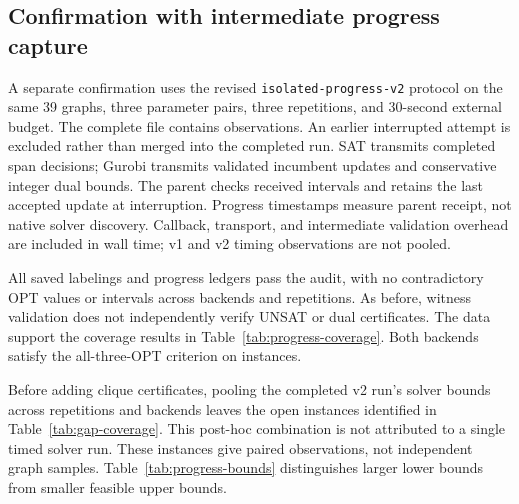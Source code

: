 \subsection{Confirmation with intermediate progress capture}
\label{sec:progress-confirmation}
A separate confirmation uses the revised \texttt{isolated-progress-v2}
protocol on the same 39 graphs, three parameter pairs, three repetitions,
and 30-second external budget. The complete file
 contains
\ProgressObservations{} observations. An earlier interrupted attempt is
excluded rather than merged into the completed run.
SAT transmits completed span decisions; Gurobi transmits validated
incumbent updates and conservative integer dual bounds. The parent checks
received intervals and retains the last accepted update at interruption.
Progress timestamps measure parent receipt, not native solver discovery.
Callback, transport, and intermediate validation overhead are included in
wall time; v1 and v2 timing observations are not pooled.

All saved labelings and progress ledgers pass the audit, with no
contradictory OPT values or intervals across backends and repetitions.
As before, witness validation does not independently verify UNSAT or dual
certificates. The data support the coverage results in
Table~\ref{tab:progress-coverage}. Both backends satisfy the all-three-OPT
criterion on \ProgressJointStable{} instances.

\begin{table}[htbp]
\centering\small
\caption{Optimality coverage and feasible solutions in v2.}
\label{tab:progress-coverage}

\end{table}

Before adding clique certificates, pooling the completed v2 run's solver
bounds across repetitions and backends leaves the \ProgressOpen{} open
instances identified in Table~\ref{tab:gap-coverage}. This post-hoc
combination is not attributed to a single timed solver run. These instances give
\ProgressOpenPairs{} paired observations, not independent graph samples.
Table~\ref{tab:progress-bounds} distinguishes larger lower bounds from
smaller feasible upper bounds.

\begin{table}[htbp]
\centering\small
\caption{Paired retained bounds in v2.}
\label{tab:progress-bounds}

\end{table}

